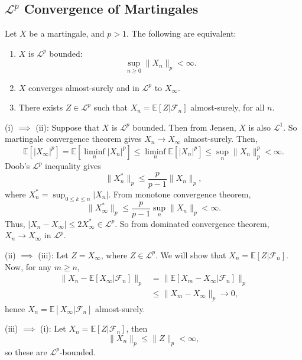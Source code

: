 \documentclass[12pt]{article}
\begin{document}
\subsection{\texorpdfstring{$\mathcal{L}^p$}{Lp} Convergence of Martingales}%
\label{sub:lp_conv_mg}

\begin{theorem}
	Let $X$ be a martingale, and $p > 1$. The following are equivalent:
	\begin{enumerate}[\normalfont(i)]
		\item $X$ is $\mathcal{L}^p$ bounded:
			\[
			\sup_{n \geq 0} \|X_n\|_p < \infty.
			\]
		\item $X$ converges almost-surely and in $\mathcal{L}^p$ to $X_\infty$.
		\item There exists $Z \in \mathcal{L}^p$ such that $X_n = \mathbb{E}[Z|\mathcal{F}_n]$ almost-surely, for all $n$.
	\end{enumerate}
\end{theorem}

\begin{proofbox}
	

	(i) $\implies$ (ii): Suppose that $X$ is $\mathcal{L}^p$ bounded. Then from Jensen, $X$ is also $\mathcal{L}^1$. So martingale convergence theorem gives $X_n \to X_\infty$ almost-surely. Then,
	\[
	\mathbb{E}[|X_\infty|^p] = \mathbb{E}[\liminf_n |X_n|^p] \leq \liminf_n \mathbb{E}[|X_n|^p] \leq \sup_n \|X_n\|_p^p < \infty.
	\]
	Doob's $\mathcal{L}^p$ inequality gives
	\[
	\|X_n^\ast\|_p \leq \frac{p}{p-1} \|X_n\|_p,
	\]
	where $X_n^\ast = \sup_{0 \leq k \leq n} |X_n|$. From monotone convergence theorem,
	\[
	\|X_\infty^\ast\|_p \leq \frac{p}{p-1} \sup_n \|X_n\|_p < \infty.
	\]
	Thus, $|X_n - X_\infty| \leq 2 X_\infty^\ast \in \mathcal{L}^p$. So from dominated convergence theorem, $X_n \to X_\infty$ in $\mathcal{L}^p$.

	(ii) $\implies$ (iii): Let $Z = X_\infty$, where $Z \in \mathcal{L}^p$. We will show that $X_n = \mathbb{E}[Z|\mathcal{F}_n]$. Now, for any $m \geq n$,
	\begin{align*}
		\|X_n - \mathbb{E}[X_\infty|\mathcal{F}_n]\|_p &= \|\mathbb{E}[X_m - X_\infty | \mathcal{F}_n]\|_p \\
							       &\leq \|X_m - X_\infty\|_p \to 0,
	\end{align*}
	hence $X_n = \mathbb{E}[X_\infty | \mathcal{F}_n]$ almost-surely.


	(iii) $\implies$ (i): Let $X_n = \mathbb{E}[Z | \mathcal{F}_n]$, then
	\[
	\|X_n\|_p \leq \|Z\|_p < \infty,
	\]
	so these are $\mathcal{L}^p$-bounded.
\end{proofbox}
\end{document}
